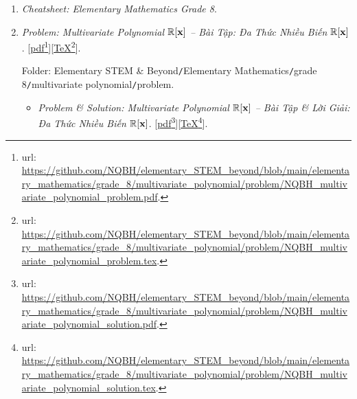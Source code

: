 \documentclass[12pt,twoside]{book}
\begin{document}
\begin{enumerate}
	\item {\it Cheatsheet: Elementary Mathematics Grade 8}.
	\item {\it Problem: Multivariate Polynomial $\mathbb{R}[{\bf x}]$ -- Bài Tập: Đa Thức Nhiều Biến $\mathbb{R}[{\bf x}]$}. [\href{https://github.com/NQBH/elementary_STEM_beyond/blob/main/elementary_mathematics/grade_8/multivariate_polynomial/problem/NQBH_multivariate_polynomial_problem.pdf}{pdf}\footnote{{\sc url}: \url{https://github.com/NQBH/elementary_STEM_beyond/blob/main/elementary_mathematics/grade_8/multivariate_polynomial/problem/NQBH_multivariate_polynomial_problem.pdf}.}][\href{https://github.com/NQBH/elementary_STEM_beyond/blob/main/elementary_mathematics/grade_8/multivariate_polynomial/problem/NQBH_multivariate_polynomial_problem.tex}{\TeX}\footnote{{\sc url}: \url{https://github.com/NQBH/elementary_STEM_beyond/blob/main/elementary_mathematics/grade_8/multivariate_polynomial/problem/NQBH_multivariate_polynomial_problem.tex}.}].
	
	Folder: {\sf Elementary STEM \& Beyond{\tt/}Elementary Mathematics{\tt/}grade 8{\tt/}multivariate polynomial{\tt/}problem}.
	\begin{itemize}
		\item {\it Problem \& Solution: Multivariate Polynomial $\mathbb{R}[{\bf x}]$ -- Bài Tập \& Lời Giải: Đa Thức Nhiều Biến $\mathbb{R}[{\bf x}]$}. [\href{https://github.com/NQBH/elementary_STEM_beyond/blob/main/elementary_mathematics/grade_8/multivariate_polynomial/problem/NQBH_multivariate_polynomial_solution.pdf}{pdf}\footnote{{\sc url}: \url{https://github.com/NQBH/elementary_STEM_beyond/blob/main/elementary_mathematics/grade_8/multivariate_polynomial/problem/NQBH_multivariate_polynomial_solution.pdf}.}][\href{https://github.com/NQBH/elementary_STEM_beyond/blob/main/elementary_mathematics/grade_8/multivariate_polynomial/problem/NQBH_multivariate_polynomial_solution.tex}{\TeX}\footnote{{\sc url}: \url{https://github.com/NQBH/elementary_STEM_beyond/blob/main/elementary_mathematics/grade_8/multivariate_polynomial/problem/NQBH_multivariate_polynomial_solution.tex}.}].
		

\end{itemize}
\end{enumerate}
\end{document}
